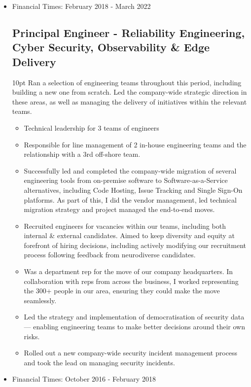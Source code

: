 \documentclass[a4paper]{article}
\newenvironment{detail}{\begin{adjustwidth}{10pt}{}}{\end{adjustwidth}}
\begin{document}
\begin{itemize}
\item Financial Times: February 2018 - March 2022
\subsection*{Principal Engineer - Reliability Engineering, Cyber Security, Observability \& Edge Delivery}
\begin{detail}
Ran a selection of engineering teams throughout this period, including building a new one from scratch.  Led the company-wide strategic direction in these areas, as well as managing the delivery of initiatives within the relevant teams.

\begin{itemize}
	\item Technical leadership for 3 teams of engineers
	\item Responsible for line management of 2 in-house engineering teams and the relationship with a 3rd off-shore team.
	\item Successfully led and completed the company-wide migration of several engineering tools from on-premise software to Software-as-a-Service alternatives, including Code Hosting, Issue Tracking and Single Sign-On platforms.  As part of this, I did the vendor management, led technical migration strategy and project managed the end-to-end moves.
	\item Recruited engineers for vacancies within our teams, including both internal \& external candidates.  Aimed to keep diversity and equity at forefront of hiring decisions, including actively modifying our recruitment process following feedback from neurodiverse candidates.
	\item Was a department rep for the move of our company headquarters.  In collaboration with reps from across the business, I worked representing the 300+ people in our area, ensuring they could make the move seamlessly.
	\item Led the strategy and implementation of democratisation of security data — enabling engineering teams to make better decisions around their own risks.
	\item Rolled out a new company-wide security incident management process and took the lead on managing security incidents.
\end{itemize}
\end{detail}

\pagebreak

\item Financial Times: October 2016 - February 2018

\end{itemize}
\end{document}
